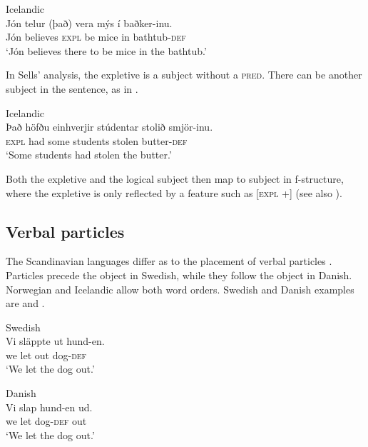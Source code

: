 \documentclass[output=paper,hidelinks]{langscibook}
\begin{document}
\ea\label{ex:Scandinavian:20} Icelandic \citep[481--2]{Thrainsson79}\\
\gll
 {Jón} {telur} {(það)} {vera} {mýs} {í} {baðker-inu.}\\
 Jón believes \phantom{(}\textsc{expl} be mice in bathtub-\textsc{def} \\
\glt `Jón believes there to be mice in the bathtub.'\z

\newpage
\noindent In Sells' analysis, the expletive is a subject without a \textsc{pred}. There can be another subject in the sentence, as in .



\ea\label{ex:Scandinavian:21} Icelandic \citep[327]{Thrainsson07}\\
\gll
 {Það} {höfðu} {einhverjir} {stúdentar} {stolið} {smjör-inu.}\\
 \textsc{expl} had some students stolen butter-\textsc{def} \\
 \glt `Some students had stolen the butter.'\z

\noindent Both the expletive and the logical subject then map to subject in f-structure, where the expletive is only reflected by a feature such as [\textsc{expl} +] (see also ).

\subsection{Verbal particles}

The Scandinavian languages differ as to the placement of verbal particles \citep{Lundquist14b}. Particles precede the object in Swedish, while they follow the object in Danish. Norwegian and Icelandic allow both word orders. Swedish and Danish examples are  and .



\ea\label{ex:Scandinavian:22} Swedish \citep[160]{Toivonen:NonProj}\\
\gll
 {Vi} {släppte} {ut} {hund-en.}\\
 we let out dog-\textsc{def}\\
\glt `We let the dog out.'\z



\ea\label{ex:Scandinavian:23} Danish \citep[160]{Toivonen:NonProj}\\
\gll
 {Vi} {slap} {hund-en} {ud.}\\
 we let dog-\textsc{def} out\\
\glt `We let the dog out.'\z
\end{document}

